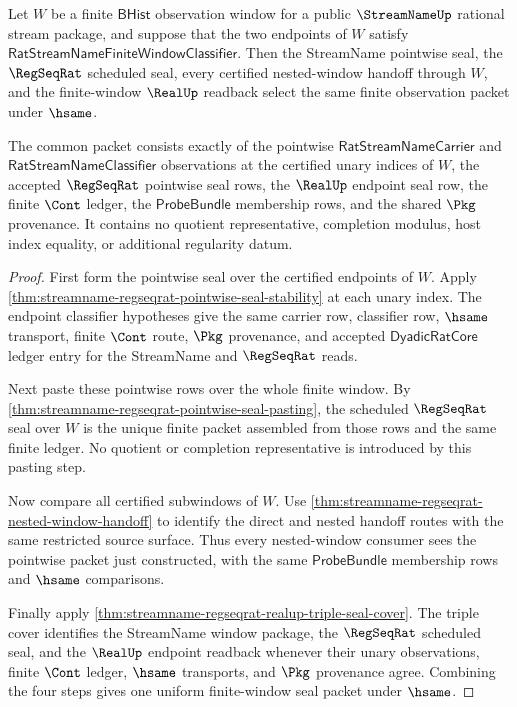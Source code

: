 \begin{theorem}
\label{thm:streamname-regseqrat-uniform-finite-window-seal}
Let $W$ be a finite $\mathsf{BHist}$ observation window for a public
$\StreamNameUp$ rational stream package, and suppose that the two endpoints
of $W$ satisfy $\mathsf{RatStreamNameFiniteWindowClassifier}$. Then the
StreamName pointwise seal, the $\RegSeqRat$ scheduled seal, every certified
nested-window handoff through $W$, and the finite-window $\RealUp$ readback
select the same finite observation packet under $\hsame$.

The common packet consists exactly of the pointwise
$\mathsf{RatStreamNameCarrier}$ and
$\mathsf{RatStreamNameClassifier}$ observations at the certified unary
indices of $W$, the accepted $\RegSeqRat$ pointwise seal rows, the
$\RealUp$ endpoint seal row, the finite $\Cont$ ledger, the
$\mathsf{ProbeBundle}$ membership rows, and the shared $\Pkg$ provenance.
It contains no quotient representative, completion modulus, host index
equality, or additional regularity datum.
\end{theorem}
\begin{proof}
First form the pointwise seal over the certified endpoints of $W$. Apply
\autoref{thm:streamname-regseqrat-pointwise-seal-stability} at each unary
index. The endpoint classifier hypotheses give the same carrier row,
classifier row, $\hsame$ transport, finite $\Cont$ route, $\Pkg$ provenance,
and accepted $\mathsf{DyadicRatCore}$ ledger entry for the StreamName and
$\RegSeqRat$ reads.

Next paste these pointwise rows over the whole finite window. By
\autoref{thm:streamname-regseqrat-pointwise-seal-pasting}, the scheduled
$\RegSeqRat$ seal over $W$ is the unique finite packet assembled from those
rows and the same finite ledger. No quotient or completion representative is
introduced by this pasting step.

Now compare all certified subwindows of $W$. Use
\autoref{thm:streamname-regseqrat-nested-window-handoff} to identify the
direct and nested handoff routes with the same restricted source surface.
Thus every nested-window consumer sees the pointwise packet just constructed,
with the same $\mathsf{ProbeBundle}$ membership rows and $\hsame$
comparisons.

Finally apply
\autoref{thm:streamname-regseqrat-realup-triple-seal-cover}. The triple cover
identifies the StreamName window package, the $\RegSeqRat$ scheduled seal,
and the $\RealUp$ endpoint readback whenever their unary observations,
finite $\Cont$ ledger, $\hsame$ transports, and $\Pkg$ provenance agree.
Combining the four steps gives one uniform finite-window seal packet under
$\hsame$.
\end{proof}

